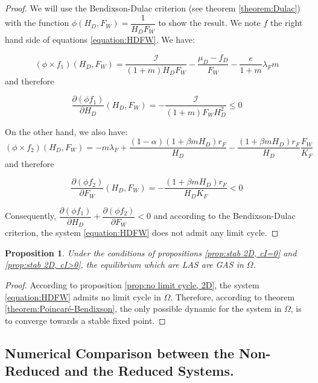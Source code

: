 \documentclass{article}
\newcommand{\lfw}{\lambda_{F}}
\newcommand{\lfw}{\lambda_{F}}
\newcommand{\cI}{\mathcal{I}}
\newtheorem{prop}{Proposition}
\begin{document}
\begin{proof}
We will use the Bendixson-Dulac criterion (see theorem \ref{theorem:Dulac}) with the function $\phi(H_D, F_W) = \dfrac{1}{H_D F_W}$ to show the result. We note $f$ the right hand side of equations \eqref{equation:HDFW}. We have:

\begin{equation*}
(\phi \times f_1)(H_D, F_W) = \dfrac{\cI}{(1+m)H_D F_W} -\dfrac{\mu_D - f_D}{F_W} - \dfrac{e}{1+m}\lfw m
\end{equation*} and therefore

\begin{equation*}
\dfrac{\partial (\phi f_1)}{\partial H_D}(H_D, F_W) = - \dfrac{\cI}{(1+m)F_W H_D^2} \leq 0
\end{equation*}

On the other hand, we also have:
\begin{equation*}
(\phi \times f_2)(H_D, F_W) = - m \lfw + \dfrac{(1-\alpha) (1+ \beta m H_D) r_F}{H_D} - \dfrac{(1+\beta m H_D) r_F}{H_D} \dfrac{F_W}{K_F}
\end{equation*} and therefore

\begin{equation*}
\dfrac{\partial (\phi f_2)}{\partial F_W}(H_D, F_W) = - \dfrac{(1+\beta m H_D) r_F}{H_D K_F} <0
\end{equation*}

Consequently, $\dfrac{\partial (\phi f_1)}{\partial H_D} + \dfrac{\partial (\phi f_2)}{\partial F_W} < 0$ and according to the Bendixson-Dulac criterion, the system \eqref{equation:HDFW} does not admit any limit cycle.

\end{proof}


\begin{prop} \label{prop:GAS, 2D}
Under the conditions of propositions \ref{prop:stab 2D, cI=0} and \ref{prop:stab 2D, cI>0}, the equilibrium which are LAS are GAS in $\Omega$.
\end{prop}


\begin{proof}
According to proposition \ref{prop:no limit cycle, 2D}, the system \eqref{equation:HDFW} admits no limit cycle in $\Omega$. Therefore, according to theorem \ref{theorem:Poincaré-Bendixson}, the only possible dynamic for the system in $\Omega$, is to converge towards a stable fixed point. 
\end{proof}

\subsection{Numerical Comparison between the Non-Reduced and the Reduced Systems.}
\end{document}
